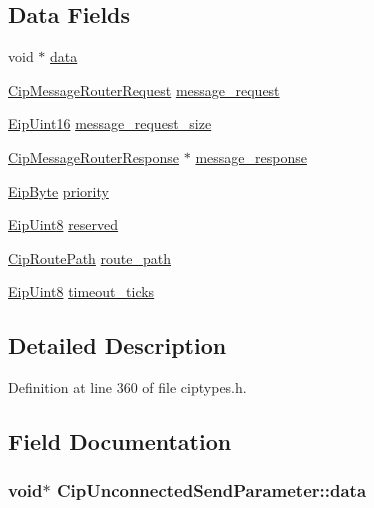 \subsection*{\-Data \-Fields}
\begin{DoxyCompactItemize}
\item 
void $\ast$ \hyperlink{structCipUnconnectedSendParameter_ab0a0e83dbbc5d88152892c0e00af4d56}{data}
\item 
\hyperlink{structCipMessageRouterRequest}{\-Cip\-Message\-Router\-Request} \hyperlink{structCipUnconnectedSendParameter_af5e4965a545d1c84217c325ab4d45a12}{message\-\_\-request}
\item 
\hyperlink{typedefs_8h_ac1b4cfa25b4f5def62f23b455dd395d8}{\-Eip\-Uint16} \hyperlink{structCipUnconnectedSendParameter_a187cc1e87799f979450a4379eccfcfc6}{message\-\_\-request\-\_\-size}
\item 
\hyperlink{structCipMessageRouterResponse}{\-Cip\-Message\-Router\-Response} $\ast$ \hyperlink{structCipUnconnectedSendParameter_a88947b0ab51ed0696ac39709c405e313}{message\-\_\-response}
\item 
\hyperlink{typedefs_8h_a168bac8db7e7e6d944700e1ac4717ae3}{\-Eip\-Byte} \hyperlink{structCipUnconnectedSendParameter_aea90d5467415fb3f6996449c87834b89}{priority}
\item 
\hyperlink{typedefs_8h_aa0c108ee762a27720919a4634643040e}{\-Eip\-Uint8} \hyperlink{structCipUnconnectedSendParameter_a7566c5068e1743451c3d7bf14ad6fa93}{reserved}
\item 
\hyperlink{structCipRoutePath}{\-Cip\-Route\-Path} \hyperlink{structCipUnconnectedSendParameter_a4155f1bd663fd20f9ba78f2057e5fd34}{route\-\_\-path}
\item 
\hyperlink{typedefs_8h_aa0c108ee762a27720919a4634643040e}{\-Eip\-Uint8} \hyperlink{structCipUnconnectedSendParameter_a832826bc7300063845b5170ee0abe486}{timeout\-\_\-ticks}
\end{DoxyCompactItemize}


\subsection{\-Detailed \-Description}


\-Definition at line 360 of file ciptypes.\-h.



\subsection{\-Field \-Documentation}
\hypertarget{structCipUnconnectedSendParameter_ab0a0e83dbbc5d88152892c0e00af4d56}{
\subsubsection[{data}]{\setlength{\rightskip}{0pt plus 5cm}void$\ast$ {\bf \-Cip\-Unconnected\-Send\-Parameter\-::data}}}\label{de/dcb/structCipUnconnectedSendParameter_ab0a0e83dbbc5d88152892c0e00af4d56}


